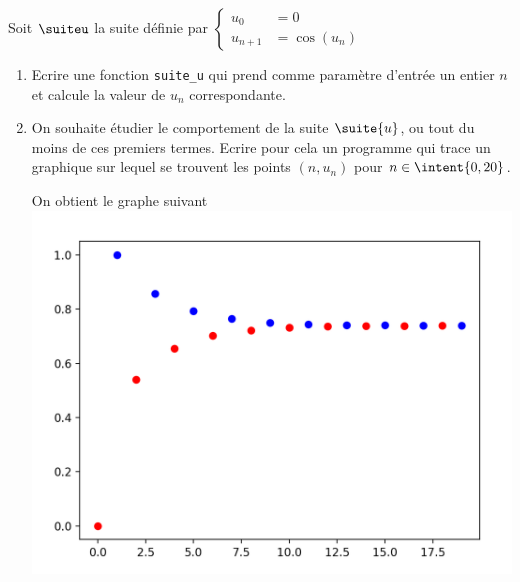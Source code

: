 



\begin{probleme}[Informatique]
Soit $\suiteu$ la suite définie par $\left\{ \begin{array}{ll} 
u_0&=0\\
u_{n+1} &= \cos(u_n)
\end{array}\right.$

\begin{enumerate}
\item Ecrire une fonction \texttt{suite\_u} qui prend comme paramètre d'entrée un entier $n$ et calcule la valeur de $u_n$ correspondante. 
\item On souhaite étudier le comportement de la suite $\suite{u}$, ou tout du moins de ces premiers termes. Ecrire pour cela un programme qui trace un graphique sur lequel se trouvent les points $(n,u_n)$ pour $n\in \intent{0,20}$.

\begin{minipage}[t]{0.4 \textwidth}
On obtient le graphe suivant
\includegraphics[scale=0.3]{suiteu}


\end{minipage}
\end{enumerate}
\end{probleme}
